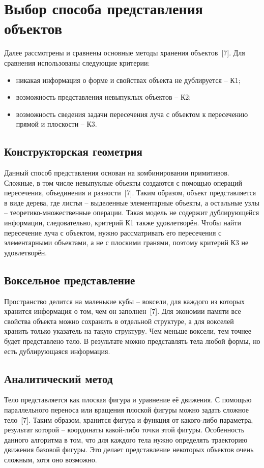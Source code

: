 \section{Выбор способа представления объектов} {
    Далее рассмотрены и сравнены основные методы хранения объектов~[7].
    Для сравнения использованы следующие критерии:
    \begin{itemize}
        \item никакая информация о форме и свойствах объекта
        не дублируется -- К1;
        \item возможность представления невыпуклых объектов -- К2;
        \item возможность сведения задачи пересечения луча с объектом
        к пересечению прямой и плоскости -- К3.
    \end{itemize}
    \subsection{Конструкторская геометрия} {
        Данный способ представления основан на комбинировании примитивов.
        Сложные, в том числе невыпуклые объекты создаются с помощью операций пересечения, объединения и разности~[7].
        Таким образом, объект представляется в виде дерева,
        где листья -- выделенные элементарные объекты, а остальные узлы --
        теоретико-множественные операции.
        Такая модель не содержит дублирующейся информации, следовательно, критерий
        К1 также удовлетворён.
        Чтобы найти пересечение луча с объектом, нужно рассматривать его
        пересечения с элементарными объектами, а не с плоскими гранями,
        поэтому критерий К3 не удовлетворён.
    }
    \subsection{Воксельное представление} {
        Пространство делится на маленькие кубы -- воксели, для
        каждого из которых хранится информация о том, чем он заполнен~[7].
        Для экономии памяти все свойства объекта можно сохранить в отдельной
        структуре, а для вокселей хранить только указатель на такую структуру.
        Чем меньше воксели, тем точнее будет представлено тело.
        В результате можно представлять тела любой формы,
        но есть дублирующаяся информация.
    }
    \subsection{Аналитический метод} {
        Тело представляется как плоская фигура и уравнение её движения.
        С помощью параллельного переноса или вращения плоской фигуры
        можно задать сложное тело~[7].
        Таким образом, хранится фигура и функция от какого-либо параметра,
        результат которой -- координаты какой-либо точки этой фигуры.
        Особенность данного алгоритма в том, что для каждого тела нужно определять
        траекторию движения базовой фигуры.
        Это делает представление некоторых объектов очень сложным, хотя оно возможно.
    }
}
